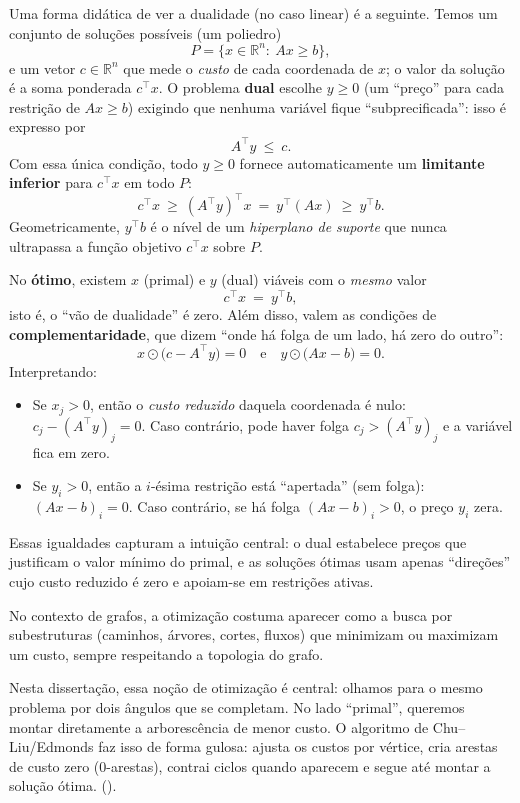 Uma forma didática de ver a dualidade (no caso linear) é a seguinte. Temos um conjunto de soluções possíveis (um poliedro)
\[P=\{x\in\mathbb{R}^n:\ Ax\ge b\},\]
e um vetor \(c\in\mathbb{R}^n\) que mede o \emph{custo} de cada coordenada de \(x\); o valor da solução é a soma ponderada \(c^\top x\). O problema \textbf{dual} escolhe \(y\ge 0\) (um “preço” para cada restrição de \(Ax\ge b\)) exigindo que nenhuma variável fique “subprecificada”: isso é expresso por
\[A^\top y\ \le\ c.\]
Com essa única condição, todo \(y\ge 0\) fornece automaticamente um \textbf{limitante inferior} para \(c^\top x\) em todo \(P\):
\[c^\top x\ \ge\ (A^\top y)^\top x\ =\ y^\top(Ax)\ \ge\ y^\top b.\]
Geometricamente, \(y^\top b\) é o nível de um \emph{hiperplano de suporte} que nunca ultrapassa a função objetivo \(c^\top x\) sobre \(P\).

No \textbf{ótimo}, existem \(x\) (primal) e \(y\) (dual) viáveis com o \emph{mesmo} valor
\[c^\top x\ =\ y^\top b,\]
isto é, o “vão de dualidade” é zero. Além disso, valem as condições de \textbf{complementaridade}, que dizem “onde há folga de um lado, há zero do outro”:
\[x\odot\big(c-A^\top y\big)=0\quad\text{e}\quad y\odot\big(Ax-b\big)=0.
\]
Interpretando:
\begin{itemize}
	\item Se \(x_j>0\), então o \emph{custo reduzido} daquela coordenada é nulo: \(c_j-(A^\top y)_j=0\). Caso contrário, pode haver folga \(c_j>(A^\top y)_j\) e a variável fica em zero.
	\item Se \(y_i>0\), então a \(i\)-ésima restrição está “apertada” (sem folga): \((Ax-b)_i=0\). Caso contrário, se há folga \((Ax-b)_i>0\), o preço \(y_i\) zera.
\end{itemize}
Essas igualdades capturam a intuição central: o dual estabelece preços que justificam o valor mínimo do primal, e as soluções ótimas usam apenas “direções” cujo custo reduzido é zero e apoiam-se em restrições ativas.


No contexto de grafos, a otimização costuma aparecer como a busca por subestruturas (caminhos, árvores, cortes, fluxos) que minimizam ou maximizam um custo, sempre respeitando a topologia do grafo.


Nesta dissertação, essa noção de otimização é central: olhamos para o mesmo problema por dois ângulos que se completam. No lado “primal”, queremos montar diretamente a arborescência de menor custo. O algoritmo de Chu–Liu/Edmonds faz isso de forma gulosa: ajusta os custos por vértice, cria arestas de custo zero (0-arestas), contrai ciclos quando aparecem e segue até montar a solução ótima.
(\cite{chu1965,edmonds1967optimum}).


